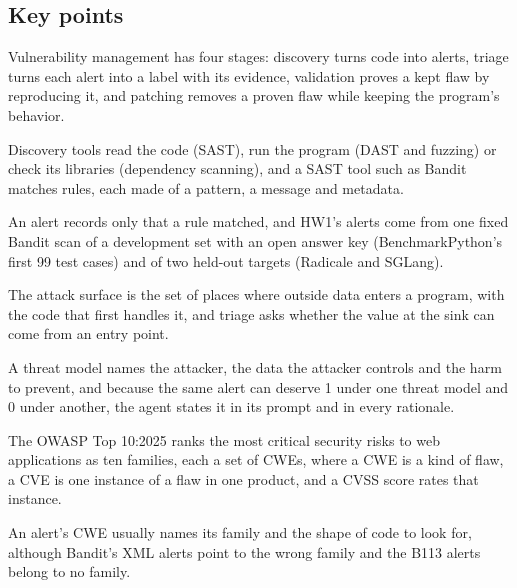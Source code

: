 \subsection*{Key points}
\bi
\item Vulnerability management has four stages: discovery turns code into alerts, triage turns each
alert into a label with its evidence, validation proves a kept flaw by reproducing it, and patching
removes a proven flaw while keeping the program's behavior.
\item Discovery tools read the code (SAST), run the program (DAST and fuzzing) or check its libraries
(dependency scanning), and a SAST tool such as Bandit matches rules, each made of a pattern, a
message and metadata.
\item An alert records only that a rule matched, and HW1's alerts come from one fixed Bandit scan of
a development set with an open answer key (BenchmarkPython's first 99 test cases) and of two
held-out targets (Radicale and SGLang).
\item The attack surface is the set of places where outside data enters a program, with the code
that first handles it, and triage asks whether the value at the sink can come from an entry point.
\item A threat model names the attacker, the data the attacker controls and the harm to prevent, and
because the same alert can deserve 1 under one threat model and 0 under another, the agent states it
in its prompt and in every rationale.
\item The OWASP Top 10:2025 ranks the most critical security risks to web applications as ten
families, each a set of CWEs, where a CWE is a kind of flaw, a CVE is one instance of a flaw in one
product, and a CVSS score rates that instance.
\item An alert's CWE usually names its family and the shape of code to look for, although Bandit's
XML alerts point to the wrong family and the B113 alerts belong to no family.
\ei
